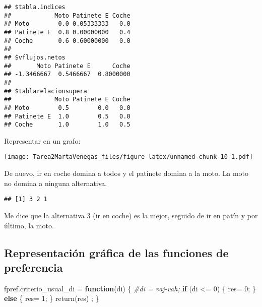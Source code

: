 \documentclass[
]{article}
\newenvironment{Shaded}{\begin{snugshade}}{\end{snugshade}}
\newcommand{\AttributeTok}[1]{\textcolor[rgb]{0.77,0.63,0.00}{#1}}
\newcommand{\CommentTok}[1]{\textcolor[rgb]{0.56,0.35,0.01}{\textit{#1}}}
\newcommand{\ControlFlowTok}[1]{\textcolor[rgb]{0.13,0.29,0.53}{\textbf{#1}}}
\newcommand{\DecValTok}[1]{\textcolor[rgb]{0.00,0.00,0.81}{#1}}
\newcommand{\FunctionTok}[1]{\textcolor[rgb]{0.00,0.00,0.00}{#1}}
\newcommand{\NormalTok}[1]{#1}
\newcommand{\OtherTok}[1]{\textcolor[rgb]{0.56,0.35,0.01}{#1}}
\newcommand{\SpecialCharTok}[1]{\textcolor[rgb]{0.00,0.00,0.00}{#1}}
\begin{document}
\begin{verbatim}
## $tabla.indices
##            Moto Patinete E Coche
## Moto        0.0 0.05333333   0.0
## Patinete E  0.8 0.00000000   0.4
## Coche       0.6 0.60000000   0.0
## 
## $vflujos.netos
##       Moto Patinete E      Coche 
## -1.3466667  0.5466667  0.8000000 
## 
## $tablarelacionsupera
##            Moto Patinete E Coche
## Moto        0.5        0.0   0.0
## Patinete E  1.0        0.5   0.0
## Coche       1.0        1.0   0.5
\end{verbatim}

Representar en un grafo:

\begin{Shaded}
\end{Shaded}

\texttt{[image: Tarea2MartaVenegas\_files/figure-latex/unnamed-chunk-10-1.pdf]}

De nuevo, ir en coche domina a todos y el patinete domina a la moto. La
moto no domina a ninguna alternativa.

\begin{Shaded}
\end{Shaded}

\begin{verbatim}
## [1] 3 2 1
\end{verbatim}

Me dice que la alternativa 3 (ir en coche) es la mejor, seguido de ir en
patín y por último, la moto.

\hypertarget{representaciuxf3n-gruxe1fica-de-las-funciones-de-preferencia}{%
\subsection{Representación gráfica de las funciones de
preferencia}\label{representaciuxf3n-gruxe1fica-de-las-funciones-de-preferencia}}

\begin{Shaded}
\begin{Highlighting}[]
\NormalTok{fpref.criterio\_usual\_di }\OtherTok{=} \ControlFlowTok{function}\NormalTok{(di) \{}
              \CommentTok{\#di = vaj{-}vah;}
    \ControlFlowTok{if}\NormalTok{ (di }\SpecialCharTok{\textless{}=} \DecValTok{0}\NormalTok{) \{}
\NormalTok{      res}\OtherTok{=} \DecValTok{0}\NormalTok{;}
\NormalTok{      \} }\ControlFlowTok{else}\NormalTok{ \{}
\NormalTok{        res}\OtherTok{=} \DecValTok{1}\NormalTok{;}
\NormalTok{      \}}
       \FunctionTok{return}\NormalTok{(res) ;}
\NormalTok{  \}}
\end{Highlighting}
\end{Shaded}
\end{document}
